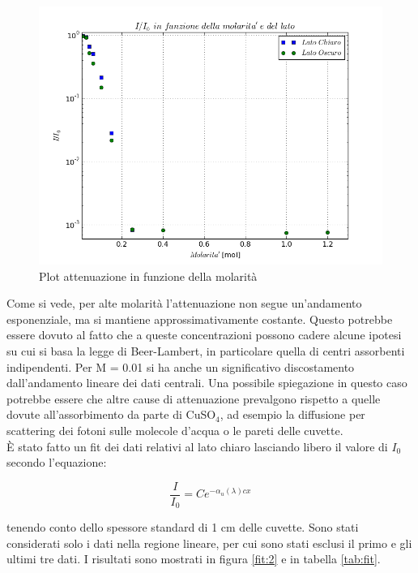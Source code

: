 \documentclass[10pt,letterpaper]{article}
\begin{document}
\begin{figure}[htp]
\centering
\includegraphics[scale=.6]{plotpowerrel}
\caption{Plot attenuazione in funzione della molarità}
\label{fig:att}
\end{figure}

Come si vede, per alte molarità l'attenuazione non segue un'andamento esponenziale, ma si mantiene approssimativamente costante. Questo potrebbe essere dovuto al fatto che a queste concentrazioni possono cadere alcune ipotesi su cui si basa la legge di Beer-Lambert, in particolare quella di centri assorbenti indipendenti. Per M = 0.01 si ha anche un significativo discostamento dall'andamento lineare dei dati centrali. Una possibile spiegazione in questo caso potrebbe essere che altre cause di attenuazione prevalgono rispetto a quelle dovute all'assorbimento da parte di CuSO$_4$, ad esempio la diffusione per scattering dei fotoni sulle molecole d'acqua o le pareti delle cuvette.\\
È stato fatto un fit dei dati relativi al lato chiaro lasciando libero il valore di $I_0$ secondo l'equazione:

\begin{equation}
\frac{I}{I_0}=C e^{- \alpha _u (\lambda) c x}
\end{equation}

tenendo conto dello spessore standard di 1 cm delle cuvette. Sono stati considerati solo i dati nella regione lineare, per cui sono stati esclusi il primo e gli ultimi tre dati. I risultati sono mostrati in figura \ref{fit:2} e in tabella \ref{tab:fit}.
\end{document}
